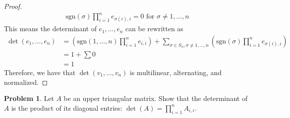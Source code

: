 \documentclass[12pt,reqno]{article}
\newcommand{\sgn}{\mathrm{sgn}}
\theoremstyle{definition}
\newtheorem{problem}{Problem}
\begin{document}
\begin{proof}
    \begin{align*}
        \sgn(\sigma)\prod_{i=1}^{n}e_{\sigma(i),i}=0 \text{ for $\sigma\neq 1,\ldots,n$}
    \end{align*}
    This means the determinant of $e_1,\ldots,e_n$ can be rewritten as
    \begin{align*}
        \det(e_1,\ldots,e_n) &= \left(\sgn(1,\ldots,n)\prod_{i=1}^{n}e_{i,i}\right) + \sum_{\sigma\in S_n,\sigma\neq 1,\ldots,n}\left(\sgn(\sigma)\prod_{i=1}^{n}e_{\sigma(i),i}\right)\\
        &= 1 + \sum 0\\
        &= 1
    \end{align*}
    Therefore, we have that $\det(v_1,\ldots,v_n)$ is multilinear, alternating, and normalized.
\end{proof}

\newpage


\begin{problem} 
Let $A$ be an upper triangular matrix. Show that the determinant of $A$ is the product of its diagonal entries:
$
\det(A) = \prod_{i = 1}^n A_{i,i}.
$
\end{problem}
\end{document}
